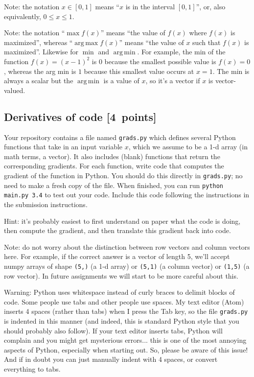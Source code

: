 \documentclass{article}
\newcommand{\blu}[1]{{\textcolor{blu}{#1}}}
\let\ask\blu
\newcommand\pts[1]{\textcolor{pointscolour}{[#1~points]}}
\DeclareMathOperator*{\argmax}{arg\,max}
\DeclareMathOperator*{\argmin}{arg\,min}
\begin{document}
  Note: the notation $x\in [0,1]$ means ``$x$ is in the interval $[0,1]$'', or, also equivalently, $0 \leq x \leq 1$.

  Note: the notation ``$\max f(x)$'' means ``the value of $f(x)$ where $f(x)$ is maximized'', whereas ``$\argmax  f(x)$'' means ``the value of $x$ such that $f(x)$ is maximized''.
  Likewise for $\min$ and $\argmin$. For example, the min of the function $f(x)=(x-1)^2$ is $0$ because the smallest possible value is $f(x)=0$,
  whereas the arg min is $1$ because this smallest value occurs at $x=1$. The min is always a scalar but the $\argmin$ is a value of $x$, so it's a vector
  if $x$ is vector-valued.

  \subsection{Derivatives of code \pts{4}}

  Your repository contains a file named \texttt{grads.py} which defines several Python functions that take in an input variable $x$, which we assume to be a 1-d array (in math terms, a vector).
  It also includes (blank) functions that return the corresponding gradients.
  For each function, \ask{write code that computes the gradient of the function} in Python.
  You should do this directly in \texttt{grads.py}; no need to make a fresh copy of the file. When finished, you can run \texttt{python main.py 3.4} to test out your code. \ask{Include this code following the instructions in the submission instructions.}

  Hint: it's probably easiest to first understand on paper what the code is doing, then compute
  the gradient, and then translate this gradient back into code.

  Note: do not worry about the distinction between row vectors and column vectors here.
  For example, if the correct answer is a vector of length 5, we'll accept numpy arrays
  of shape \texttt{(5,)} (a 1-d array) or \texttt{(5,1)} (a column vector) or
  \texttt{(1,5)} (a row vector). In future assignments we will start to be more careful
  about this.

  Warning: Python uses whitespace instead of curly braces to delimit blocks of code.
  Some people use tabs and other people use spaces. My text editor (Atom) inserts 4 spaces (rather than tabs) when
  I press the Tab key, so the file \texttt{grads.py} is indented in this manner (and indeed, this is standard Python style that you should probably also follow). If your text editor inserts tabs,
  Python will complain and you might get mysterious errors... this is one of the most annoying aspects
  of Python, especially when starting out. So, please be aware of this issue! And if in doubt you can just manually
  indent with 4 spaces, or convert everything to tabs.
\end{document}
